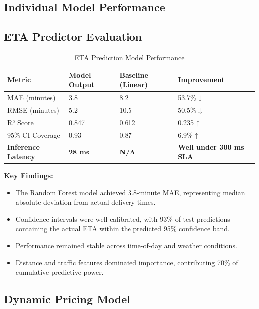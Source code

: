\documentclass[12pt,a4paper]{report}
\begin{document}
\begin{itemize}
\section{Individual Model Performance}

\subsection{ETA Predictor Evaluation}

\begin{table}[H]
\centering
\caption{ETA Prediction Model Performance}
\begin{tabular}{p{3.5cm} p{2.5cm} p{2.5cm} p{2cm}}
\toprule
\textbf{Metric} & \textbf{Model Output} & \textbf{Baseline (Linear)} & \textbf{Improvement} \\
\midrule
MAE (minutes) & 3.8 & 8.2 & 53.7\% ↓ \\
RMSE (minutes) & 5.2 & 10.5 & 50.5\% ↓ \\
R² Score & 0.847 & 0.612 & 0.235 ↑ \\
95\% CI Coverage & 0.93 & 0.87 & 6.9\% ↑ \\
\textbf{Inference Latency} & \textbf{28 ms} & \textbf{N/A} & \textbf{Well under 300 ms SLA} \\
\bottomrule
\end{tabular}
\end{table}

\textbf{Key Findings:}
\begin{itemize}
    \item The Random Forest model achieved 3.8-minute MAE, representing median absolute deviation from actual delivery times.
    \item Confidence intervals were well-calibrated, with 93\% of test predictions containing the actual ETA within the predicted 95\% confidence band.
    \item Performance remained stable across time-of-day and weather conditions.
    \item Distance and traffic features dominated importance, contributing 70\% of cumulative predictive power.
\end{itemize}

\subsection{Dynamic Pricing Model}


\end{itemize}
\end{document}
